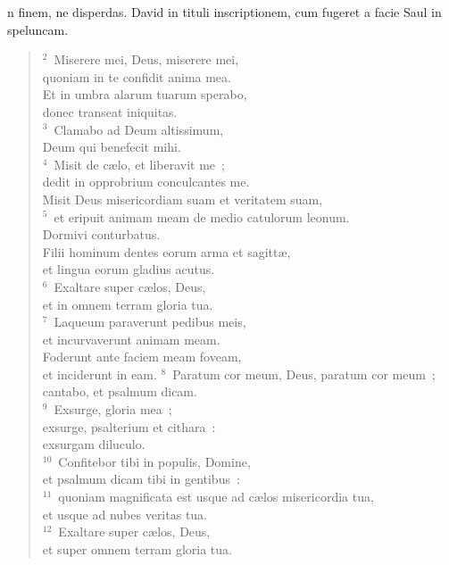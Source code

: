 \bchapter[Psalm]
n finem, ne disperdas. David in tituli inscriptionem, cum fugeret a facie Saul in speluncam.
\begin{verse}${}^{2}$~Miserere mei, Deus, miserere mei,\\ quoniam in te confidit anima mea.\\ Et in umbra alarum tuarum sperabo,\\ donec transeat iniquitas.\\
${}^{3}$~Clamabo ad Deum altissimum,\\ Deum qui benefecit mihi.\\
${}^{4}$~Misit de c\ae lo, et liberavit me~;\\ dedit in opprobrium conculcantes me.\\ Misit Deus misericordiam suam et veritatem suam,\\
${}^{5}$~et eripuit animam meam de medio catulorum leonum.\\ Dormivi conturbatus.\\ Filii hominum dentes eorum arma et sagitt\ae ,\\ et lingua eorum gladius acutus.\\
${}^{6}$~Exaltare super c\ae los, Deus,\\ et in omnem terram gloria tua.\\
${}^{7}$~Laqueum paraverunt pedibus meis,\\ et incurvaverunt animam meam.\\ Foderunt ante faciem meam foveam,\\ et inciderunt in eam.
${}^{8}$~Paratum cor meum, Deus, paratum cor meum~;\\ cantabo, et psalmum dicam.\\
${}^{9}$~Exsurge, gloria mea~;\\ exsurge, psalterium et cithara~:\\ exsurgam diluculo.\\
${}^{10}$~Confitebor tibi in populis, Domine,\\ et psalmum dicam tibi in gentibus~:\\
${}^{11}$~quoniam magnificata est usque ad c\ae los misericordia tua,\\ et usque ad nubes veritas tua.\\
${}^{12}$~Exaltare super c\ae los, Deus,\\ et super omnem terram gloria tua.\end{verse}



